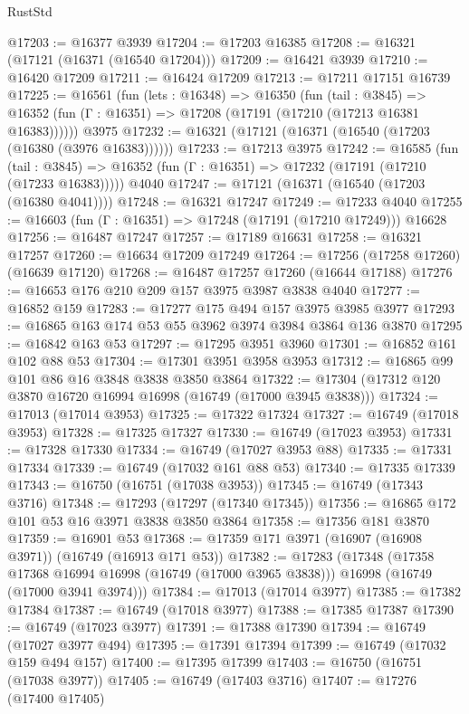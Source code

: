 \begin{lexlean}{RustStd}
\begin{coremodule}
@17203 := @16377 @3939
@17204 := @17203 @16385
@17208 := @16321 (@17121 (@16371 (@16540 @17204)))
@17209 := @16421 @3939
@17210 := @16420 @17209
@17211 := @16424 @17209
@17213 := @17211 @17151 @16739
@17225 := @16561
    (fun (lets : @16348) =>
    @16350
      (fun (tail : @3845) =>
      @16352 (fun (Γ : @16351) => @17208 (@17191 (@17210 (@17213 @16381 @16383))))))
    @3975
@17232 := @16321 (@17121 (@16371 (@16540 (@17203 (@16380 (@3976 @16383))))))
@17233 := @17213 @3975
@17242 := @16585
    (fun (tail : @3845) => @16352 (fun (Γ : @16351) => @17232 (@17191 (@17210 (@17233 @16383)))))
    @4040
@17247 := @17121 (@16371 (@16540 (@17203 (@16380 @4041))))
@17248 := @16321 @17247
@17249 := @17233 @4040
@17255 := @16603 (fun (Γ : @16351) => @17248 (@17191 (@17210 @17249))) @16628
@17256 := @16487 @17247
@17257 := @17189 @16631
@17258 := @16321 @17257
@17260 := @16634 @17209 @17249
@17264 := @17256 (@17258 @17260) (@16639 @17120)
@17268 := @16487 @17257 @17260 (@16644 @17188)
@17276 := @16653 @176 @210 @209 @157 @3975 @3987 @3838 @4040
@17277 := @16852 @159
@17283 := @17277 @175 @494 @157 @3975 @3985 @3977
@17293 := @16865 @163 @174 @53 @55 @3962 @3974 @3984 @3864 @136 @3870
@17295 := @16842 @163 @53
@17297 := @17295 @3951 @3960
@17301 := @16852 @161 @102 @88 @53
@17304 := @17301 @3951 @3958 @3953
@17312 := @16865 @99 @101 @86 @16 @3848 @3838 @3850 @3864
@17322 := @17304 (@17312 @120 @3870 @16720 @16994 @16998 (@16749 (@17000 @3945 @3838)))
@17324 := @17013 (@17014 @3953)
@17325 := @17322 @17324
@17327 := @16749 (@17018 @3953)
@17328 := @17325 @17327
@17330 := @16749 (@17023 @3953)
@17331 := @17328 @17330
@17334 := @16749 (@17027 @3953 @88)
@17335 := @17331 @17334
@17339 := @16749 (@17032 @161 @88 @53)
@17340 := @17335 @17339
@17343 := @16750 (@16751 (@17038 @3953))
@17345 := @16749 (@17343 @3716)
@17348 := @17293 (@17297 (@17340 @17345))
@17356 := @16865 @172 @101 @53 @16 @3971 @3838 @3850 @3864
@17358 := @17356 @181 @3870
@17359 := @16901 @53
@17368 := @17359 @171 @3971 (@16907 (@16908 @3971)) (@16749 (@16913 @171 @53))
@17382 := @17283
    (@17348
      (@17358 @17368 @16994 @16998 (@16749 (@17000 @3965 @3838)))
      @16998
      (@16749 (@17000 @3941 @3974)))
@17384 := @17013 (@17014 @3977)
@17385 := @17382 @17384
@17387 := @16749 (@17018 @3977)
@17388 := @17385 @17387
@17390 := @16749 (@17023 @3977)
@17391 := @17388 @17390
@17394 := @16749 (@17027 @3977 @494)
@17395 := @17391 @17394
@17399 := @16749 (@17032 @159 @494 @157)
@17400 := @17395 @17399
@17403 := @16750 (@16751 (@17038 @3977))
@17405 := @16749 (@17403 @3716)
@17407 := @17276 (@17400 @17405)

\end{coremodule}
\end{lexlean}
